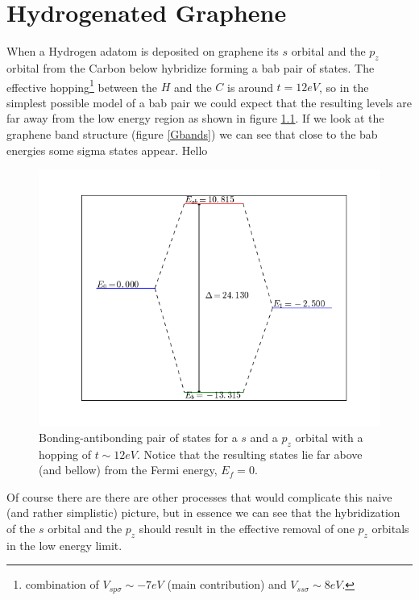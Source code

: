 \chapter{Hydrogenated Graphene}
When a Hydrogen adatom is deposited on graphene its $s$ orbital and the $p_z$ orbital from the Carbon below hybridize forming a \ac{bab} pair of states. The effective hopping\footnote{combination of $V_{sp\sigma}\sim -7eV$ (main contribution) and $V_{ss\sigma}\sim 8eV$.} between the $H$ and the $C$ is around $t=12eV$, so in the simplest possible model of a \ac{bab} pair we could expect that the resulting levels are far away from the low energy region as shown in figure \ref{bab}. If we look at the graphene band structure (figure \ref{Gbands}) we can see that close to the \ac{bab} energies some sigma states appear. Hello
\begin{figure}[h!]
\centering
\includegraphics{chapter05/figures/bonding_antibonding.png}
\vspace{-5pt}
\caption{Bonding-antibonding pair of states for a $s$ and a $p_z$ orbital with a hopping of $t\sim 12eV$. Notice that the resulting states lie far above (and bellow) from the Fermi energy, $E_f=0$.}
\label{bab}
\end{figure}
\FloatBarrier
Of course there are there are other processes that would complicate this naive (and rather simplistic) picture, but in essence we can see that the hybridization of the $s$ orbital and the $p_z$ should result in the effective removal of one $p_z$ orbitals in the low energy limit.\\

